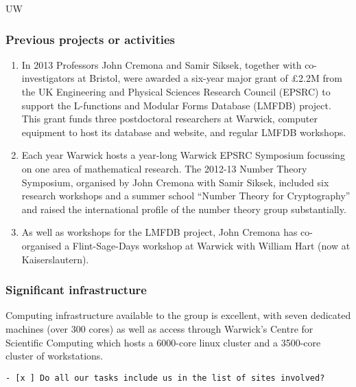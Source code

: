 \begin{sitedescription}{UW}
\subsubsection*{Previous projects or activities}

\begin{enumerate}
\item
In 2013 Professors John Cremona and Samir Siksek, together with
co-investigators at Bristol, were awarded a six-year major grant of
£2.2M from the UK Engineering and Physical Sciences Research Council
(EPSRC) to support the L-functions and Modular Forms Database (LMFDB)
project.  This grant funds three postdoctoral researchers at Warwick,
computer equipment to host its database and website, and regular LMFDB
workshops.
\item
Each year Warwick hosts a year-long Warwick EPSRC Symposium focussing
on one area of mathematical research.  The 2012-13 Number Theory
Symposium, organised by John Cremona with Samir Siksek, included six
research workshops and a summer school ``Number Theory for
Cryptography'' and raised the international profile of the number
theory group substantially.
\item
As well as workshops for the LMFDB project, John Cremona has
co-organised a Flint-Sage-Days workshop at Warwick with William Hart
(now at Kaiserslautern).
\end{enumerate}

\subsubsection*{Significant infrastructure}

Computing infrastructure available to the group is excellent, with
seven dedicated machines (over 300 cores) as well as access through
Warwick's Centre for Scientific Computing which hosts a 6000-core
linux cluster and a 3500-core cluster of workstations.
\end{sitedescription}

\begin{draft}
\vspace{1cm}
\begin{verbatim}
- [x ] Do all our tasks include us in the list of sites involved?
\end{verbatim}
\end{draft}






